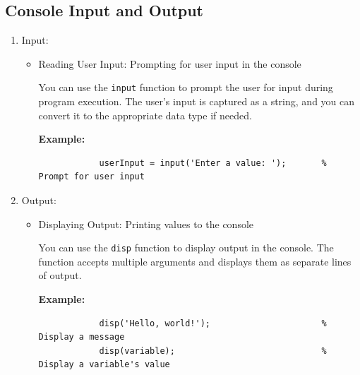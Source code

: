 \documentclass[
11pt, %
a4paper, %
oneside, %
headinclude,footinclude, %
BCOR5mm, %
]{scrartcl}
\begin{document}
\subsection{Console Input and Output}
\begin{enumerate}
	\item Input:
	\begin{itemize}
		\item Reading User Input: Prompting for user input in the console
		
		You can use the \texttt{input} function to prompt the user for input during program execution. The user's input is captured as a string, and you can convert it to the appropriate data type if needed.
		
		\textbf{Example:}
		\begin{verbatim}
			userInput = input('Enter a value: ');       % Prompt for user input
		\end{verbatim}
	\end{itemize}
	
	\item Output:
	\begin{itemize}
		\item Displaying Output: Printing values to the console
		
		You can use the \texttt{disp} function to display output in the console. The function accepts multiple arguments and displays them as separate lines of output.
		
		\textbf{Example:}
		\begin{verbatim}
			disp('Hello, world!');                      % Display a message
			disp(variable);                             % Display a variable's value
		\end{verbatim}
	\end{itemize}
\end{enumerate}
\end{document}
